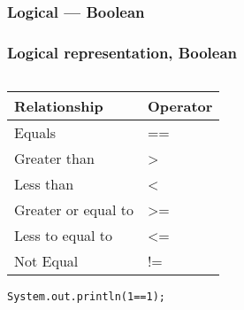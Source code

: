 \documentclass[
  11pt, %
  xcolor=dvipsnames
]{beamer}
\begin{document}
\subsubsection{Logical --- Boolean}
\begin{frame}[fragile]
	\frametitle{Logical representation, Boolean}


	\begin{columns}[c]
		\begin{column}{0.9\textwidth}

			\begin{table}
				\begin{tabular}{l l}
					\toprule
					Relationship        & Operator \\
					\midrule
					Equals              & ==       \\
					Greater than        & >        \\
					Less than           & <        \\
					Greater or equal to & >=       \\
					Less to equal to    & <=       \\
					Not Equal           & !=       \\
					\bottomrule
				\end{tabular}
			\end{table}

			\begin{lstlisting}[style=Java]
System.out.println(1==1);
      \end{lstlisting}

		\end{column}
	\end{columns}

\end{frame}
\end{document}
